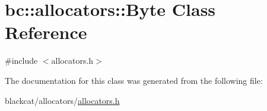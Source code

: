 \hypertarget{classbc_1_1allocators_1_1Byte}{}\section{bc\+:\+:allocators\+:\+:Byte Class Reference}
\label{classbc_1_1allocators_1_1Byte}


{\ttfamily \#include $<$allocators.\+h$>$}



The documentation for this class was generated from the following file\+:\begin{DoxyCompactItemize}
\item 
blackcat/allocators/\hyperlink{allocators_8h}{allocators.\+h}\end{DoxyCompactItemize}
